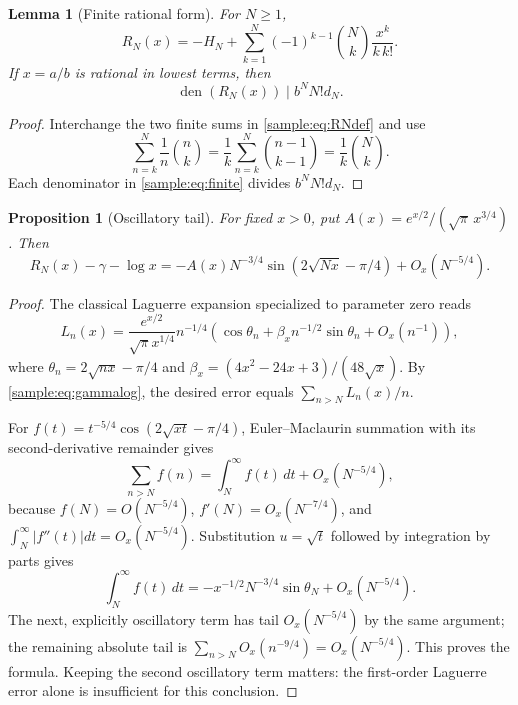 \documentclass[11pt,a4paper]{article}
\DeclareMathOperator{\den}{den}
\newtheorem{proposition}[theorem]{Proposition}
\newtheorem{lemma}[theorem]{Lemma}
\theoremstyle{definition}
\theoremstyle{remark}
\numberwithin{equation}{section}
\begin{document}
\begin{lemma}[Finite rational form]\label{sample:lem:finite}
For $N\ge1$,
\begin{equation}\label{sample:eq:finite}
R_N(x)=-H_N+
\sum_{k=1}^N(-1)^{k-1}\binom Nk\frac{x^k}{k\,k!}.
\end{equation}
If $x=a/b$ is rational in lowest terms, then
\begin{equation}\label{sample:eq:rawden}
\den(R_N(x))\mid b^N N!d_N.
\end{equation}
\end{lemma}
\begin{proof}
Interchange the two finite sums in \eqref{sample:eq:RNdef} and use
\[
\sum_{n=k}^N\frac1n\binom nk
=\frac1k\sum_{n=k}^N\binom{n-1}{k-1}
=\frac1k\binom Nk.
\]
Each denominator in \eqref{sample:eq:finite} divides $b^NN!d_N$.
\end{proof}

\begin{proposition}[Oscillatory tail]\label{sample:prop:tail}
For fixed $x>0$, put
$A(x)=e^{x/2}/(\sqrt\pi\,x^{3/4})$. Then
\begin{equation}\label{sample:eq:tail}
R_N(x)-\gamma-\log x
=-A(x)N^{-3/4}\sin(2\sqrt{Nx}-\pi/4)+O_x(N^{-5/4}).
\end{equation}
\end{proposition}
\begin{proof}
The classical Laguerre expansion \cite[18.15.14--18.15.16]{DLMF}
specialized to parameter zero reads
\[
L_n(x)=\frac{e^{x/2}}{\sqrt\pi x^{1/4}}n^{-1/4}
\left(\cos\theta_n+\beta_xn^{-1/2}\sin\theta_n+O_x(n^{-1})\right),
\]
where $\theta_n=2\sqrt{nx}-\pi/4$ and
$\beta_x=(4x^2-24x+3)/(48\sqrt x)$.
By \eqref{sample:eq:gammalog}, the desired error equals
$\sum_{n>N}L_n(x)/n$.

For $f(t)=t^{-5/4}\cos(2\sqrt{xt}-\pi/4)$, Euler--Maclaurin summation
with its second-derivative remainder gives
\[
\sum_{n>N}f(n)=\int_N^\infty f(t)\,dt+O_x(N^{-5/4}),
\]
because $f(N)=O(N^{-5/4})$, $f'(N)=O_x(N^{-7/4})$, and
$\int_N^\infty|f''(t)|dt=O_x(N^{-5/4})$.
Substitution $u=\sqrt t$ followed by integration by parts gives
\[
\int_N^\infty f(t)\,dt
=-x^{-1/2}N^{-3/4}\sin\theta_N+O_x(N^{-5/4}).
\]
The next, explicitly oscillatory term has tail $O_x(N^{-5/4})$ by the
same argument; the remaining absolute tail is
$\sum_{n>N}O_x(n^{-9/4})=O_x(N^{-5/4})$.
This proves the formula. Keeping the second oscillatory term matters:
the first-order Laguerre error alone is insufficient for this conclusion.
\end{proof}
\end{document}
